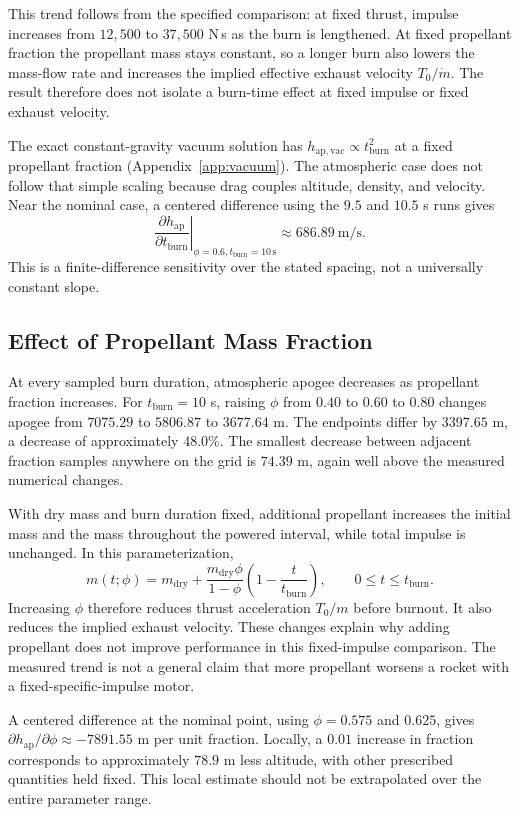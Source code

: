 \documentclass{article}
\begin{document}
This trend follows from the specified comparison: at fixed thrust, impulse increases from $12{,}500$ to $37{,}500$ N\,s as the burn is lengthened. At fixed propellant fraction the propellant mass stays constant, so a longer burn also lowers the mass-flow rate and increases the implied effective exhaust velocity $T_0/\dot m$. The result therefore does not isolate a burn-time effect at fixed impulse or fixed exhaust velocity.

The exact constant-gravity vacuum solution has $h_{\mathrm{ap,vac}}\propto t_{\mathrm{burn}}^2$ at a fixed propellant fraction (Appendix~\ref{app:vacuum}). The atmospheric case does not follow that simple scaling because drag couples altitude, density, and velocity. Near the nominal case, a centered difference using the $9.5$ and $10.5$ s runs gives
\[
 \left.\frac{\partial h_{\mathrm{ap}}}{\partial t_{\mathrm{burn}}}\right|_{\phi=0.6,t_{\mathrm{burn}}=10\,\mathrm{s}}
 \approx 686.89\ \mathrm{m/s}.
\]
This is a finite-difference sensitivity over the stated spacing, not a universally constant slope.

\subsection{Effect of Propellant Mass Fraction}
At every sampled burn duration, atmospheric apogee decreases as propellant fraction increases. For $t_{\mathrm{burn}}=10$ s, raising $\phi$ from $0.40$ to $0.60$ to $0.80$ changes apogee from $7075.29$ to $5806.87$ to $3677.64$ m. The endpoints differ by $3397.65$ m, a decrease of approximately $48.0\%$. The smallest decrease between adjacent fraction samples anywhere on the grid is $74.39$ m, again well above the measured numerical changes.

With dry mass and burn duration fixed, additional propellant increases the initial mass and the mass throughout the powered interval, while total impulse is unchanged. In this parameterization,
\[
 m(t;\phi)=m_{\mathrm{dry}}+
 \frac{m_{\mathrm{dry}}\phi}{1-\phi}\left(1-\frac{t}{t_{\mathrm{burn}}}\right),
 \qquad 0\leq t\leq t_{\mathrm{burn}}.
\]
Increasing $\phi$ therefore reduces thrust acceleration $T_0/m$ before burnout. It also reduces the implied exhaust velocity. These changes explain why adding propellant does not improve performance in this fixed-impulse comparison. The measured trend is not a general claim that more propellant worsens a rocket with a fixed-specific-impulse motor.

A centered difference at the nominal point, using $\phi=0.575$ and $0.625$, gives $\partial h_{\mathrm{ap}}/\partial\phi\approx-7891.55$ m per unit fraction. Locally, a $0.01$ increase in fraction corresponds to approximately $78.9$ m less altitude, with other prescribed quantities held fixed. This local estimate should not be extrapolated over the entire parameter range.
\end{document}
